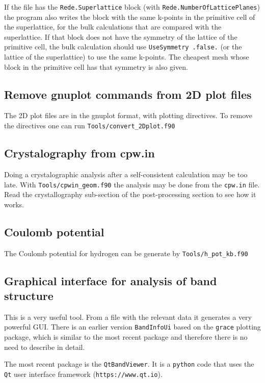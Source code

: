 \documentclass[11pt]{article}
\begin{document}
If the file has the \texttt{Rede.Superlattice} block (with \texttt{Rede.NumberOfLatticePlanes})
the program also writes the block with the same k-points in the primitive cell of the superlattice,
for the bulk calculations that are compared with the superlattice.  If that block does not have the
symmetry of the lattice of the primitive cell, the bulk calculation should use
\texttt{UseSymmetry .false.} (or the lattice of the superlattice) to use the same k-points.
The cheapest mesh whose block in the primitive cell has that symmetry is also given.

\subsection{Remove gnuplot commands from 2D plot files}

The 2D plot files are in the gnuplot format, with plotting directives.  To remove the
directives one can run \texttt{Tools/convert\_2Dplot.f90}

\subsection{Crystalography from cpw.in}

Doing a crystalographic analysis after a self-consistent calculation
may be too late.  With \texttt{Tools/cpwin\_geom.f90}
the analysis may be done from the \texttt{cpw.in} file.
Read the crystallography sub-section of the post-processing section
to see how it works.

\subsection{Coulomb potential}

The Coulomb potential for hydrogen can be generate by \texttt{Tools/h\_pot\_kb.f90}

\subsection{Graphical interface for analysis of band structure}

This is a very useful tool.  From a file with the relevant data
it generates a very powerful GUI.  There is an earlier version \texttt{BandInfoUi}
based on the \texttt{grace} plotting package, which is similar to the most recent
package and therefore there is no need to describe in detail.

The most recent package is the \texttt{QtBandViewer}.  It is a \texttt{python}
code that uses the \texttt{Qt} user interface framework (\texttt{https://www.qt.io}).
\end{document}
